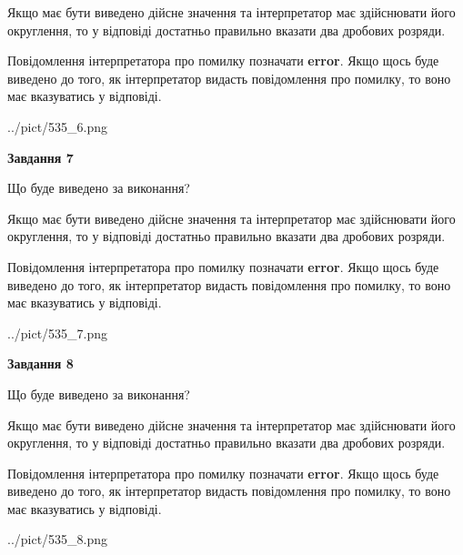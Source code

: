 \documentclass[12pt, ukrainian]{article}
\begin{document}
{\begin {Large}
Якщо має бути виведено дійсне значення та інтерпретатор має здійснювати його округлення, 
то у відповіді достатньо правильно вказати два дробових розряди.

Повідомлення інтерпретатора про помилку позначати \textbf{error}.
Якщо щось буде виведено до того, як інтерпретатор видасть повідомлення про помилку, 
то воно має вказуватись у відповіді. \par

\begin{center}
	{../pict/535_6.png}
\end{center}
\newpage

{\begin {center}\textbf{Завдання 7}\end {center}}\par
Що буде виведено за виконання? \par

Якщо має бути виведено дійсне значення та інтерпретатор має здійснювати його округлення, 
то у відповіді достатньо правильно вказати два дробових розряди.

Повідомлення інтерпретатора про помилку позначати \textbf{error}.
Якщо щось буде виведено до того, як інтерпретатор видасть повідомлення про помилку, 
то воно має вказуватись у відповіді. \par

\begin{center}
	{../pict/535_7.png}
\end{center}
\newpage

{\begin {center}\textbf{Завдання 8}\end {center}}\par
Що буде виведено за виконання? \par

Якщо має бути виведено дійсне значення та інтерпретатор має здійснювати його округлення, 
то у відповіді достатньо правильно вказати два дробових розряди.

Повідомлення інтерпретатора про помилку позначати \textbf{error}.
Якщо щось буде виведено до того, як інтерпретатор видасть повідомлення про помилку, 
то воно має вказуватись у відповіді. \par

\begin{center}
	{../pict/535_8.png}
\end{center}
\newpage


\end{Large}}
\end{document}
